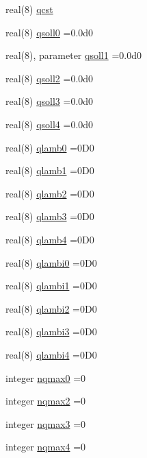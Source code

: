 \begin{DoxyCompactItemize}
\item 
real(8) \hyperlink{namespaceconstr_a88ea236140e2db61760449c622b6aefb}{qcst}
\item 
real(8) \hyperlink{namespaceconstr_abfbf6522e18eaf9397748a01e84e7894}{qsoll0} =0.\+0d0
\item 
real(8), parameter \hyperlink{namespaceconstr_ab8723fa9ecb2a5b18496b199e586f3a8}{qsoll1} =0.\+0d0
\item 
real(8) \hyperlink{namespaceconstr_a58b40724ec16e519451b798d3d7ab8b6}{qsoll2} =0.\+0d0
\item 
real(8) \hyperlink{namespaceconstr_a9efb1bbf605739cd45eb23ba02e096e4}{qsoll3} =0.\+0d0
\item 
real(8) \hyperlink{namespaceconstr_a7bc9e25c46df09075468fed7a86255f7}{qsoll4} =0.\+0d0
\item 
real(8) \hyperlink{namespaceconstr_a71a650091cb17d25c0fa7c8a3a013cb5}{qlamb0} =0\+D0
\item 
real(8) \hyperlink{namespaceconstr_a63e33f7b185213d983929801556d3724}{qlamb1} =0\+D0
\item 
real(8) \hyperlink{namespaceconstr_a9ca0a1590d9f556ff216f87edce932aa}{qlamb2} =0\+D0
\item 
real(8) \hyperlink{namespaceconstr_add50840d9e3f3339a914faf7021b4ed8}{qlamb3} =0\+D0
\item 
real(8) \hyperlink{namespaceconstr_a75f9086ecf6dfa3e0112d61c7238d08e}{qlamb4} =0\+D0
\item 
real(8) \hyperlink{namespaceconstr_a17954f7fbd341fdc4cca55cefe24fb51}{qlambi0} =0\+D0
\item 
real(8) \hyperlink{namespaceconstr_a141f76999ff788fc33f775e86437ceb3}{qlambi1} =0\+D0
\item 
real(8) \hyperlink{namespaceconstr_abdf9acb351b618a77f3c43b98a9b283e}{qlambi2} =0\+D0
\item 
real(8) \hyperlink{namespaceconstr_a4a0d15f8f8e83f0b7dd528b860449684}{qlambi3} =0\+D0
\item 
real(8) \hyperlink{namespaceconstr_a64a62a693071f3fa8bd0f3c3f59bf7df}{qlambi4} =0\+D0
\item 
integer \hyperlink{namespaceconstr_a710fd344f93aa434d6f4482c305d49fe}{nqmax0} =0
\item 
integer \hyperlink{namespaceconstr_a15579247e103dc4f248a298032da8b95}{nqmax2} =0
\item 
integer \hyperlink{namespaceconstr_a374984e30040eafafc33bee0ed78bdd0}{nqmax3} =0
\item 
integer \hyperlink{namespaceconstr_a36db4844bd18081dedf01da07f16b382}{nqmax4} =0

\end{DoxyCompactItemize}
